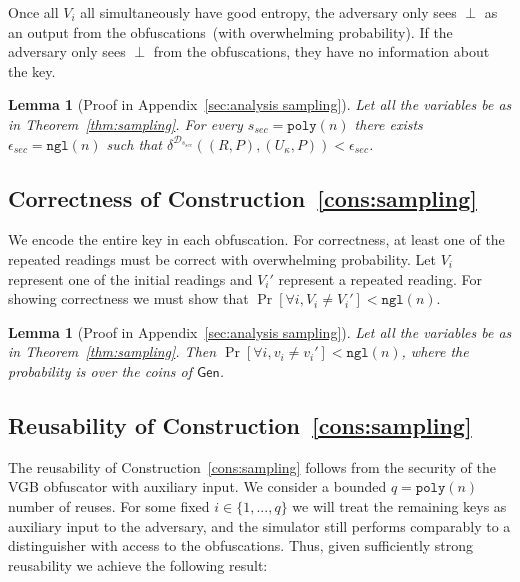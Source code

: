 \documentclass[11pt]{article}
\newcommand{\apref}[1]{\mbox{Appendix~\ref{#1}}}
\newcommand{\thref}[1]{\mbox{Theorem~\ref{#1}}}
\newcommand{\corref}[1]{\mbox{Corollary~\ref{#1}}}
\newcommand{\lemref}[1]{\mbox{Lemma~\ref{#1}}}
\newcommand{\consref}[1]{\mbox{Construction~\ref{#1}}}
\newcommand{\class}[1]{{\ensuremath{\mathsf{#1}}}}
\newcommand{\gen}{\ensuremath{\class{Gen}}\xspace}
\newcommand{\poly}{\ensuremath{\mathtt{poly}}\xspace}
\newcommand{\ngl}{\ensuremath{\mathtt{ngl}}\xspace}
\newtheorem{lemma}[theorem]{Lemma}
\begin{document}
Once all $V_i$ all simultaneously have good entropy, the adversary only sees $\perp$ as an output from the obfuscations~(with overwhelming probability).  If the adversary only sees $\perp$ from the obfuscations, they have no information about the key.

\begin{lemma}[Proof in \apref{sec:analysis sampling}]
\label{lem:samp unguess}
Let all the variables be as in \thref{thm:sampling}.
For every $s_{sec} = \poly(n)$ there exists $\epsilon_{sec} = \ngl(n)$ such that $\delta^{\mathcal{D}_{s_{sec}}}((R, P), (U_{\kappa}, P))< \epsilon_{sec}$.%
\end{lemma}

\subsection{Correctness of \consref{cons:sampling}}
\label{sec:correct sampling}
We encode the entire key in each obfuscation.  For correctness, at least one of the repeated readings must be correct with overwhelming probability.  Let $V_i$ represent one of the initial readings and $V_i'$ represent a repeated reading.  For showing correctness we must show that $\Pr[\forall i, V_i \neq V_i'] < \ngl(n)$.



\begin{lemma}[Proof in \apref{sec:analysis sampling}]
\label{lem:sampling errors}
Let all the variables be as in \thref{thm:sampling}.
 Then $\Pr[\forall i, v_i\neq v_i'] < \ngl(n)$, where the probability is over the coins of $\gen$.
\end{lemma}

\subsection{Reusability of \consref{cons:sampling}}
The reusability of \consref{cons:sampling} follows from the security of the VGB obfuscator with auxiliary input.  We consider a bounded $q = \poly(n)$ number of reuses.  For some fixed $i\in \{1,..., q\}$ we will treat the remaining keys as auxiliary input to the adversary, and the simulator still performs comparably to a distinguisher with access to the obfuscations.  Thus, given sufficiently strong reusability we achieve the following result:
\end{document}
